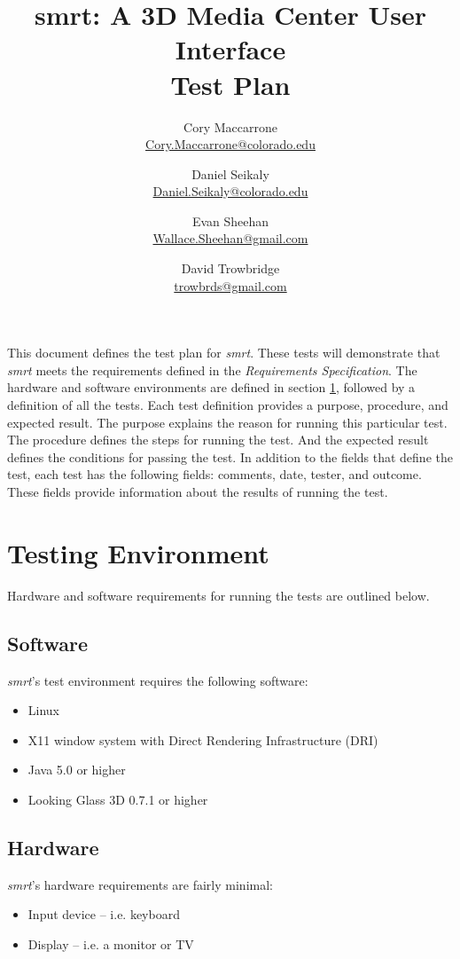 \documentclass[letterpaper, titlepage, 11pt]{article}
\title{
	smrt: A 3D Media Center User Interface
	\\
	Test Plan
}
\author{
	Cory Maccarrone  \\ {\small \href{mailto:Cory.Maccarrone@colorado.edu}{Cory.Maccarrone@colorado.edu}}
	\and
	Daniel Seikaly   \\ {\small \href{mailto:Daniel.Seikaly@colorado.edu}{Daniel.Seikaly@colorado.edu}}
	\and
	Evan Sheehan     \\ {\small \href{mailto:Wallace.Sheehan@gmail.com}{Wallace.Sheehan@gmail.com}}
	\and
	David Trowbridge \\ {\small \href{mailto:trowbrds@gmail.com}{trowbrds@gmail.com}}
}
\begin{document}
\maketitle

\raggedbottom


\hspace{1em}
\pagebreak

\tableofcontents
\listoffigures
\pagebreak

\hspace{1em}
\pagebreak




This document defines the test plan for \textit{smrt}. These tests will
demonstrate that \textit{smrt} meets the requirements defined in the
\textit{Requirements Specification}. The hardware and software environments are
defined in section \ref{sec:environment}, followed by a definition of all the
tests. Each test definition provides a purpose, procedure, and expected result.
The purpose explains the reason for running this particular test. The procedure
defines the steps for running the test. And the expected result defines the
conditions for passing the test. In addition to the fields that define the
test, each test has the following fields: comments, date, tester, and outcome.
These fields provide information about the results of running the test.

\section{Testing Environment}
\label{sec:environment}
Hardware and software requirements for running the tests are outlined below.

\subsection{Software}
\textit{smrt}'s test environment requires the following software:
\begin{itemize}
\item Linux
\item X11 window system with Direct Rendering Infrastructure (DRI)
\item Java 5.0 or higher
\item Looking Glass 3D 0.7.1 or higher
\end{itemize}

\subsection{Hardware}
\textit{smrt}'s hardware requirements are fairly minimal:
\begin{itemize}
\item Input device -- i.e. keyboard
\item Display -- i.e. a monitor or TV
\end{itemize}
\end{document}
